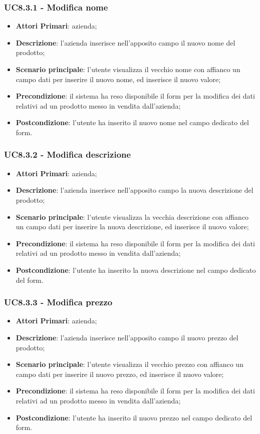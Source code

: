 \subsubsection{UC8.3.1 - Modifica nome}
\begin{itemize}
	\item \textbf{Attori Primari}: azienda;
	\item \textbf{Descrizione}: l'azienda inserisce nell'apposito campo il nuovo nome del prodotto;
	\item \textbf{Scenario principale}: l'utente visualizza il vecchio nome con affianco un campo dati per inserire il nuovo nome, ed inserisce il nuovo valore;
	\item \textbf{Precondizione}: il sistema ha reso disponibile il form per la modifica dei dati relativi ad un prodotto messo in vendita dall'azienda;
	\item \textbf{Postcondizione}: l'utente ha inserito il nuovo nome nel campo dedicato del form.
\end{itemize}

\subsubsection{UC8.3.2 - Modifica descrizione}
\begin{itemize}
	\item \textbf{Attori Primari}: azienda;
	\item \textbf{Descrizione}: l'azienda inserisce nell'apposito campo la nuova descrizione del prodotto;
	\item \textbf{Scenario principale}: l'utente visualizza la vecchia descrizione con affianco un campo dati per inserire la nuova descrizione, ed inserisce il nuovo valore;
	\item \textbf{Precondizione}: il sistema ha reso disponibile il form per la modifica dei dati relativi ad un prodotto messo in vendita dall'azienda;
	\item \textbf{Postcondizione}: l'utente ha inserito la nuova descrizione nel campo dedicato del form.
\end{itemize}

\subsubsection{UC8.3.3 - Modifica prezzo}
\begin{itemize}
	\item \textbf{Attori Primari}: azienda;
	\item \textbf{Descrizione}: l'azienda inserisce nell'apposito campo il nuovo prezzo del prodotto;
	\item \textbf{Scenario principale}: l'utente visualizza il vecchio prezzo con affianco un campo dati per inserire il nuovo prezzo, ed inserisce il nuovo valore;
	\item \textbf{Precondizione}: il sistema ha reso disponibile il form per la modifica dei dati relativi ad un prodotto messo in vendita dall'azienda;
	\item \textbf{Postcondizione}: l'utente ha inserito il nuovo prezzo nel campo dedicato del form.
\end{itemize}

